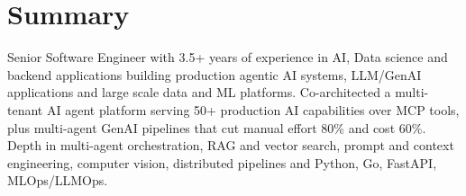 \section{Summary}

Senior Software Engineer with 3.5+ years of experience in AI, Data science and backend applications building production agentic AI systems, LLM/GenAI applications and large scale data and ML platforms. Co-architected a multi-tenant AI agent platform serving 50+ production AI capabilities over MCP tools, plus multi-agent GenAI pipelines that cut manual effort 80\% and cost 60\%. Depth in multi-agent orchestration, RAG and vector search, prompt and context engineering, computer vision, distributed pipelines and Python, Go, FastAPI, MLOps/LLMOps.
